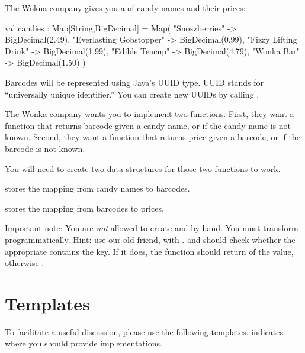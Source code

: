 \documentclass{book}
\begin{document}
The Wokna company gives you a  of candy names and their prices:

\begin{scalacode}
val candies : Map[String,BigDecimal] = Map(
  "Snozzberries" -> BigDecimal(2.49),
  "Everlasting Gobstopper" -> BigDecimal(0.99),
  "Fizzy Lifting Drink" -> BigDecimal(1.99),
  "Edible Teacup" -> BigDecimal(4.79),
  "Wonka Bar" -> BigDecimal(1.50)
)
\end{scalacode}

Barcodes will be represented using Java's UUID type.  UUID stands for ``universally unique identifier.''  You can create new UUIDs by calling .

The Wonka company wants you to implement two functions.  First, they want a function  that returns  barcode given a candy name, or  if the candy name is not known.  Second, they want a function  that returns  price given a barcode, or  if the barcode is not known.

You will need to create two  data structures for those two functions to work.

 stores the mapping from candy names to barcodes.

 stores the mapping from barcodes to prices.

\underline{Important note:} You are \emph{not} allowed to create  and  by hand.  You must transform  programmatically.  Hint: use our old friend,  with .   and  should check whether the appropriate  contains the key.  If it does, the function should return  of the value, otherwise .

\section{Templates}

To facilitate a useful discussion, please use the following templates.   indicates where you should provide implementations.
\end{document}
